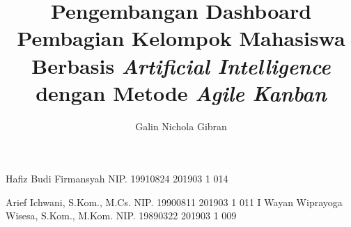 \documentclass[twoside]{report} %
\begin{document}

\title{Pengembangan Dashboard Pembagian Kelompok Mahasiswa Berbasis \textit{Artificial Intelligence} dengan Metode \textit{Agile Kanban}}

\author{Galin Nichola Gibran}		%

\dosbingA%
{Hafiz Budi Firmansyah}%
{NIP. 19910824 201903 1 014}	%

\pengujiA%
{Arief Ichwani, S.Kom., M.Cs.}%
{NIP. 19900811 201903 1 011}	%
\pengujiB%
{I Wayan Wiprayoga Wisesa, S.Kom., M.Kom.}%
{NIP. 19890322 201903 1 009}	%

\sloppy %
\setcounter{page}{1} %
\end{document}
